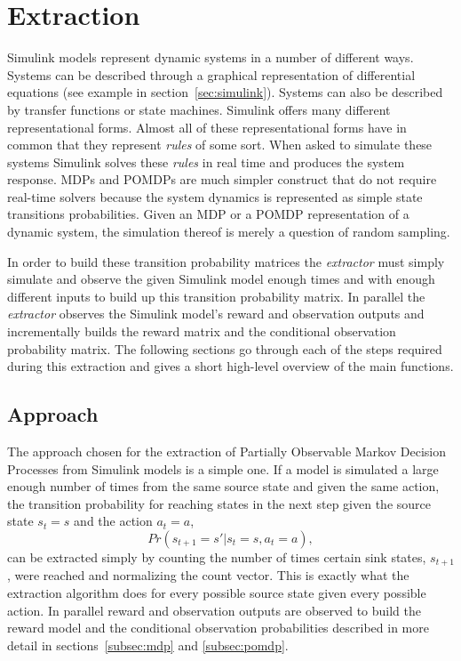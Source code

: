 \section{Extraction}

Simulink models represent dynamic systems in a number of different ways. Systems can be described through a graphical representation of differential equations (see example in section~\ref{sec:simulink}). Systems can also be described by transfer functions or state machines. Simulink offers many different representational forms. Almost all of these representational forms have in common that they represent \textit{rules} of some sort. When asked to simulate these systems Simulink solves these \textit{rules} in real time and produces the system response. MDPs and POMDPs are much simpler construct that do not require real-time solvers because the system dynamics is represented as simple state transitions probabilities. Given an MDP or a POMDP representation of a dynamic system, the simulation thereof is merely a question of random sampling.

In order to build these transition probability matrices the \textit{extractor} must simply simulate and observe the given Simulink model enough times and with enough different inputs to build up this transition probability matrix. In parallel the \textit{extractor} observes the Simulink model's reward and observation outputs and incrementally builds the reward matrix and the conditional observation probability matrix. The following sections go through each of the steps required during this extraction and gives a short high-level overview of the main functions.

\subsection{Approach}
\label{subsec:approach}

The approach chosen for the extraction of Partially Observable Markov Decision Processes from Simulink models is a simple one. If a model is simulated a large enough number of times from the same source state and given the same action, the transition probability for reaching states in the next step given the source state $s_t = s$ and the action $a_t = a$,
\[
Pr(s_{t+1} = s'|s_t = s, a_t = a),
\]
can be extracted simply by counting the number of times certain sink states, $s_{t+1}$, were reached and normalizing the count vector. This is exactly what the extraction algorithm does for every possible source state given every possible action. In parallel reward and observation outputs are observed to build the reward model and the conditional observation probabilities described in more detail in sections~\ref{subsec:mdp} and \ref{subsec:pomdp}.

